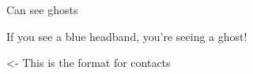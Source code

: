 \documentclass[char]{Silversiders}
\begin{document}
Can see ghosts

\begin{itemz}[Goals]
	\item 
\end{itemz}

\begin{itemz}[Notes]
	\item If you see a blue headband, you're seeing a ghost!
\end{itemz}

\begin{contacts}
	\contact{\cTest{}} <- This is the format for contacts 
\end{contacts}
\end{document}
